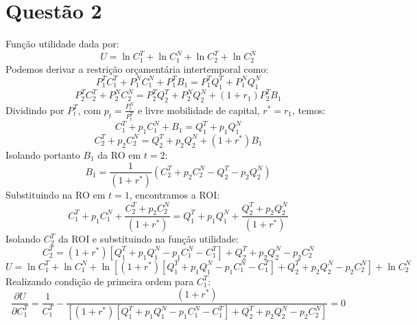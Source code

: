 \documentclass{article}
\begin{document}
\section*{Questão 2}
Função utilidade dada por:
\begin{equation*}
    U = \ln C_1^T + \ln C_1^N + \ln C_2^T + \ln C_2^N
\end{equation*}
Podemos derivar a restrição orçamentária intertemporal como:
\begin{equation*}
    P_1^T C_1^T + P_1^N C_1^N + P_1^T B_1 = P_1^T Q_1^T + P_1^N Q_1^N
\end{equation*}
\begin{equation*}
    P_2^T C_2^T + P_2^N C_2^N = P_2^T Q_2^T + P_2^N Q_2^N + (1+r_1)P_2^T B_1
\end{equation*}
Dividindo por $P_t^T$, com $p_t=\frac{P_t^N}{P_t^T}$ e livre mobilidade de capital, $r^*=r_1$, temos:
\begin{equation*}
    C_1^T + p_1 C_1^N + B_1 = Q_1^T + p_1 Q_1^N
\end{equation*}
\begin{equation*}
   C_2^T + p_2 C_2^N = Q_2^T + p_2 Q_2^N + (1+r^*) B_1
\end{equation*}
Isolando portanto $B_1$ da RO em $t=2$:
\begin{equation*}
   B_1 = \frac{1}{(1+r^*)}(C_2^T + p_2 C_2^N - Q_2^T - p_2 Q_2^N)
\end{equation*}
Substituindo na RO em $t=1$, encontramos a ROI:
\begin{equation*}
    C_1^T + p_1 C_1^N + \frac{C_2^T + p_2 C_2^N}{(1+r^*)}= Q_1^T + p_1 Q_1^N + \frac{Q_2^T + p_2 Q_2^N}{(1+r^*)}
\end{equation*}
Isolando $C_2^T$ da ROI e substituindo na função utilidade:
\begin{equation*}
     C_2^T = (1+r^*)\left[Q_1^T + p_1 Q_1^N- p_1 C_1^N-C_1^T \right] + Q_2^T + p_2 Q_2^N- p_2 C_2^N
\end{equation*}
\begin{equation*}
    U = \ln C_1^T + \ln C_1^N + \ln \left[(1+r^*)\left[Q_1^T + p_1 Q_1^N- p_1 C_1^N-C_1^T \right] + Q_2^T + p_2 Q_2^N- p_2 C_2^N\right] + \ln C_2^N
\end{equation*}
Realizando condição de primeira ordem para $C_1^T$:
\begin{equation*}
    \frac{\partial U}{\partial C_1^T}=\frac{1}{C_1^T}-\frac{(1+r^*)}{\left[(1+r^*)\left[Q_1^T + p_1 Q_1^N- p_1 C_1^N-C_1^T \right] + Q_2^T + p_2 Q_2^N- p_2 C_2^N\right]}=0
\end{equation*}
\end{document}
